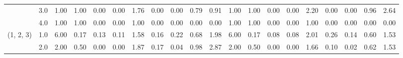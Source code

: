 \begin{tabular}{llrrrrrrrrrrrrrrrrrr}
          & 3.0 &               1.00 &                     1.00 &                                 0.00 &                             0.00 &                           1.76 &                                               0.00 &                                            0.00 &                                            0.79 &                                        0.91 &               1.00 &                     1.00 &                                 0.00 &                             0.00 &                           2.20 &                                               0.00 &                                            0.00 &                                            0.96 &                                        2.64 \\
          & 4.0 &               1.00 &                     1.00 &                                 0.00 &                             0.00 &                           1.00 &                                               0.00 &                                            0.00 &                                            0.00 &                                        0.00 &               1.00 &                     1.00 &                                 0.00 &                             0.00 &                           1.00 &                                               0.00 &                                            0.00 &                                            0.00 &                                        0.00 \\
(1, 2, 3) & 1.0 &               6.00 &                     0.17 &                                 0.13 &                             0.11 &                           1.58 &                                               0.16 &                                            0.22 &                                            0.68 &                                        1.98 &               6.00 &                     0.17 &                                 0.08 &                             0.08 &                           2.01 &                                               0.26 &                                            0.14 &                                            0.60 &                                        1.53 \\
          & 2.0 &               2.00 &                     0.50 &                                 0.00 &                             0.00 &                           1.87 &                                               0.17 &                                            0.04 &                                            0.98 &                                        2.87 &               2.00 &                     0.50 &                                 0.00 &                             0.00 &                           1.66 &                                               0.10 &                                            0.02 &                                            0.62 &                                        1.53 \\

\end{tabular}
